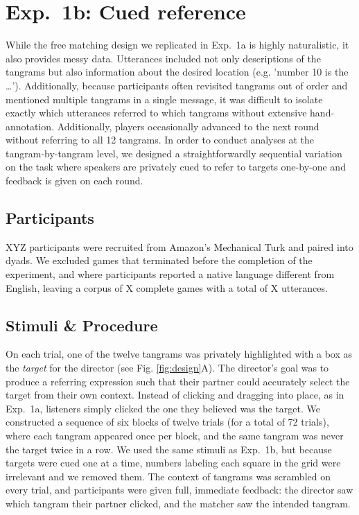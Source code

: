 \documentclass[alpha-refs]{wiley-article}
\begin{document}
\section{Exp.~1b: Cued reference}

While the free matching design we replicated in Exp.~1a is highly naturalistic, it also provides messy data. Utterances included not only descriptions of the tangrams but also information about the desired location (e.g. 'number 10 is the \dots'). Additionally, because participants often revisited tangrams out of order and mentioned multiple tangrams in a single message, it was difficult to isolate exactly which utterances referred to which tangrams without extensive hand-annotation. Additionally, players occasionally advanced to the next round without referring to all 12 tangrams. In order to conduct analyses at the tangram-by-tangram level, we designed a straightforwardly sequential variation on the task where speakers are privately cued to refer to targets one-by-one and feedback is given on each round. 

\subsection{Participants}\label{participants}

XYZ participants were recruited from Amazon's Mechanical Turk and paired
into dyads. We excluded games that terminated before the completion
of the experiment, and where participants reported a native language different
from English, leaving a corpus of X complete games with a total of
X utterances.

\subsection{Stimuli \& Procedure}\label{stimuli}

On each trial, one of the twelve tangrams was privately highlighted with a box as the \emph{target} for the director (see Fig. \ref{fig:design}A). The director's goal was to produce a referring expression such that their partner could accurately select the target from their own context. Instead of clicking and dragging into place, as in Exp.~1a, listeners simply clicked the one they believed was the target. We constructed a sequence of six blocks of twelve trials (for a total of 72 trials), where each tangram appeared once per block, and the same tangram was never the target twice in a row. We used the same stimuli as Exp.~1b, but because targets were cued one at a time, numbers labeling each square in the grid were irrelevant and we removed them. The context of tangrams was scrambled on every trial, and participants were given full, immediate feedback: the director saw which tangram their partner clicked, and the matcher saw the intended tangram.
\end{document}

